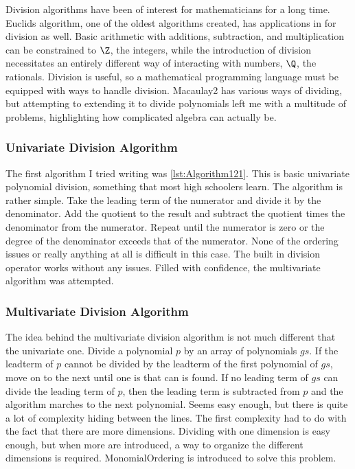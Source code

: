 Division algorithms have been of interest for mathematicians for a long time. Euclids algorithm, one of the oldest algorithms created, has applications in for division as well. Basic arithmetic with additions, subtraction, and multiplication can be constrained to $\Z$, the integers, while the introduction of division necessitates an entirely different way of interacting with numbers, $\Q$, the rationals. Division is useful, so a mathematical programming language must be equipped with ways to handle division. Macaulay2 has various ways of dividing, but attempting to extending it to divide polynomials left me with a multitude of problems, highlighting how complicated algebra can actually be. 

\subsubsection{Univariate Division Algorithm}
The first algorithm I tried writing was \ref{lst:Algorithm121}. This is basic univariate polynomial division, something that most high schoolers learn. The algorithm is rather simple. Take the leading term of the numerator and divide it by the denominator. Add the quotient to the result and subtract the quotient times the denominator from the numerator. Repeat until the numerator is zero or the degree of the denominator exceeds that of the numerator. None of the ordering issues or really anything at all is difficult in this case. The built in division operator works without any issues. Filled with confidence, the multivariate algorithm was attempted. 

\subsubsection{Multivariate Division Algorithm}
The idea behind the multivariate division algorithm is not much different that the univariate one. Divide a polynomial $p$ by an array of polynomials $gs$. If the leadterm of $p$ cannot be divided by the leadterm of the first polynomial of $gs$, move on to the next until one is that can is found. If no leading term of $gs$ can divide the leading term of $p$, then the leading term is subtracted from $p$ and the algorithm marches to the next polynomial. Seems easy enough, but there is quite a lot of complexity hiding between the lines. The first complexity had to do with the fact that there are more dimensions. Dividing with one dimension is easy enough, but when more are introduced, a way to organize the different dimensions is required. MonomialOrdering is introduced to solve this problem. 

